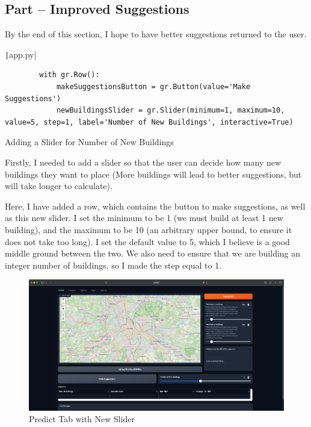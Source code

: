 \documentclass[12pt]{report}
\newcommand{\pil}[1]{\protect\texttt|#1|}
\begin{document}
\subsection{Part \theparts{} -- Improved Suggestions}

By the end of this section, I hope to have better suggestions returned to the user.

\begin{listing}[H]
\pil{app.py}
\begin{verbatim}
        with gr.Row():
            makeSuggestionsButton = gr.Button(value='Make Suggestions')
            newBuildingsSlider = gr.Slider(minimum=1, maximum=10, value=5, step=1, label='Number of New Buildings', interactive=True)
\end{verbatim}
\caption{Adding a Slider for Number of New Buildings}\label{cs:numNewBuildings}
\end{listing}

Firstly, I needed to add a slider so that the user can decide how many new buildings they want to place (More buildings will lead to better suggestions, but will take longer to calculate).

Here, I have added a row, which contains the button to make suggestions, as well as this new slider. I set the minimum to be 1 (we must build at least 1 new building), and the maximum to be 10 (an arbitrary upper bound, to ensure it does not take too long). I set the default value to 5, which I believe is a good middle ground between the two. We also need to ensure that we are building an integer number of buildings, so I made the step equal to 1.

\begin{figure}[H]
\centering
\includegraphics[width=14cm]{ss21.1.png}
\caption{Predict Tab with New Slider}\label{fig:ss21.1}
\end{figure}
\end{document}
